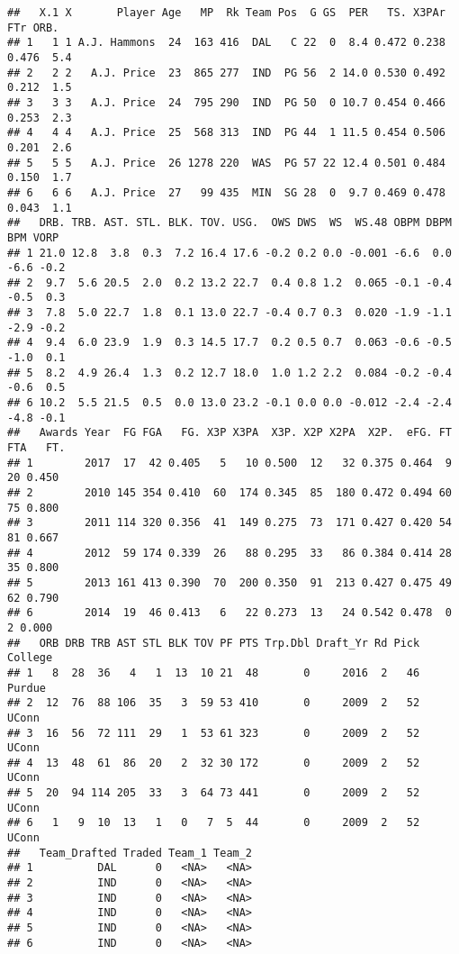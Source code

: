\documentclass[
]{article}
\begin{document}
\begin{verbatim}
##   X.1 X       Player Age   MP  Rk Team Pos  G GS  PER   TS. X3PAr   FTr ORB.
## 1   1 1 A.J. Hammons  24  163 416  DAL   C 22  0  8.4 0.472 0.238 0.476  5.4
## 2   2 2   A.J. Price  23  865 277  IND  PG 56  2 14.0 0.530 0.492 0.212  1.5
## 3   3 3   A.J. Price  24  795 290  IND  PG 50  0 10.7 0.454 0.466 0.253  2.3
## 4   4 4   A.J. Price  25  568 313  IND  PG 44  1 11.5 0.454 0.506 0.201  2.6
## 5   5 5   A.J. Price  26 1278 220  WAS  PG 57 22 12.4 0.501 0.484 0.150  1.7
## 6   6 6   A.J. Price  27   99 435  MIN  SG 28  0  9.7 0.469 0.478 0.043  1.1
##   DRB. TRB. AST. STL. BLK. TOV. USG.  OWS DWS  WS  WS.48 OBPM DBPM  BPM VORP
## 1 21.0 12.8  3.8  0.3  7.2 16.4 17.6 -0.2 0.2 0.0 -0.001 -6.6  0.0 -6.6 -0.2
## 2  9.7  5.6 20.5  2.0  0.2 13.2 22.7  0.4 0.8 1.2  0.065 -0.1 -0.4 -0.5  0.3
## 3  7.8  5.0 22.7  1.8  0.1 13.0 22.7 -0.4 0.7 0.3  0.020 -1.9 -1.1 -2.9 -0.2
## 4  9.4  6.0 23.9  1.9  0.3 14.5 17.7  0.2 0.5 0.7  0.063 -0.6 -0.5 -1.0  0.1
## 5  8.2  4.9 26.4  1.3  0.2 12.7 18.0  1.0 1.2 2.2  0.084 -0.2 -0.4 -0.6  0.5
## 6 10.2  5.5 21.5  0.5  0.0 13.0 23.2 -0.1 0.0 0.0 -0.012 -2.4 -2.4 -4.8 -0.1
##   Awards Year  FG FGA   FG. X3P X3PA  X3P. X2P X2PA  X2P.  eFG. FT FTA   FT.
## 1        2017  17  42 0.405   5   10 0.500  12   32 0.375 0.464  9  20 0.450
## 2        2010 145 354 0.410  60  174 0.345  85  180 0.472 0.494 60  75 0.800
## 3        2011 114 320 0.356  41  149 0.275  73  171 0.427 0.420 54  81 0.667
## 4        2012  59 174 0.339  26   88 0.295  33   86 0.384 0.414 28  35 0.800
## 5        2013 161 413 0.390  70  200 0.350  91  213 0.427 0.475 49  62 0.790
## 6        2014  19  46 0.413   6   22 0.273  13   24 0.542 0.478  0   2 0.000
##   ORB DRB TRB AST STL BLK TOV PF PTS Trp.Dbl Draft_Yr Rd Pick College
## 1   8  28  36   4   1  13  10 21  48       0     2016  2   46  Purdue
## 2  12  76  88 106  35   3  59 53 410       0     2009  2   52   UConn
## 3  16  56  72 111  29   1  53 61 323       0     2009  2   52   UConn
## 4  13  48  61  86  20   2  32 30 172       0     2009  2   52   UConn
## 5  20  94 114 205  33   3  64 73 441       0     2009  2   52   UConn
## 6   1   9  10  13   1   0   7  5  44       0     2009  2   52   UConn
##   Team_Drafted Traded Team_1 Team_2
## 1          DAL      0   <NA>   <NA>
## 2          IND      0   <NA>   <NA>
## 3          IND      0   <NA>   <NA>
## 4          IND      0   <NA>   <NA>
## 5          IND      0   <NA>   <NA>
## 6          IND      0   <NA>   <NA>
\end{verbatim}
\end{document}
